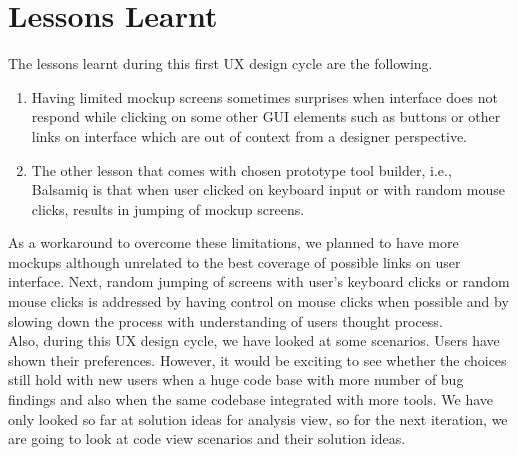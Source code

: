 \section{Lessons Learnt}

The lessons learnt during this first UX design cycle are the following. \\

\begin{enumerate}
\item Having limited mockup screens sometimes surprises when interface does not respond while clicking on some other GUI elements such as buttons or other links on interface which are out of context from a designer perspective.
\item The other lesson that comes with chosen prototype tool builder, i.e., Balsamiq is that when user clicked on keyboard input or with random mouse clicks, results in jumping of mockup screens.  \\
\end{enumerate}

As a workaround to overcome these limitations, we planned to have more mockups although unrelated to the best coverage of possible links on user interface. Next, random jumping of screens with user's keyboard clicks or random mouse clicks is addressed by having control on mouse clicks when possible and by slowing down the process with understanding of users thought process. \\

Also, during this UX design cycle, we have looked at some scenarios. Users have shown their preferences. However, it would be exciting to see whether the choices still hold with new users when a huge code base with more number of bug findings and also when the same codebase integrated with more tools. We have only looked so far at solution ideas for analysis view, so for the next iteration, we are going to look at code view scenarios and their solution ideas.

\let\cleardoublepage\clearpage
